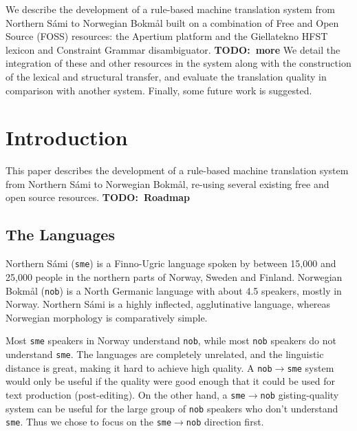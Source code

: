 \newcommand{\comment}[1]{\textbf{TODO:~#1}}


\newcommand{\href}[2]{{\tt #1}} %

\newcommand{\sme}{{\tt sme}}
\newcommand{\nob}{{\tt nob}}
\newcommand{\smenob}{\sme$\rightarrow{}$\nob}
\newcommand{\nobsme}{\nob$\rightarrow{}$\sme}



  
    We describe the development of a rule-based machine translation
    system from Northern Sámi to Norwegian Bokmål built on a
    combination of Free and Open Source (FOSS) resources: the Apertium
    platform and the Giellatekno HFST lexicon and Constraint Grammar
    disambiguator.
    \comment{more}
    We detail the integration of these and other resources in the
    system along with the construction of the lexical and structural
    transfer, and evaluate the translation quality in comparison with
    another system. Finally, some future work is suggested.




\section{Introduction}
This paper describes the development of a rule-based machine
translation system from Northern Sámi to Norwegian Bokmål, re-using
several existing free and open source resources. \comment{Roadmap}

\subsection{The Languages}
Northern Sámi (\sme{}) is a Finno-Ugric language spoken by between
15,000 and 25,000 people in the northern parts of Norway, Sweden and
Finland. Norwegian Bokmål (\nob{}) is a North Germanic language with
about 4.5 speakers, mostly in Norway. Northern Sámi is a highly
inflected, agglutinative language, whereas Norwegian morphology is
comparatively simple.

Most \sme{} speakers in Norway understand \nob{}, while most \nob{}
speakers do not understand \sme{}. The languages are completely
unrelated, and the linguistic distance is great, making it hard to
achieve high quality. A \nobsme{} system would only be useful if the
quality were good enough that it could be used for text production
(post-editing). On the other hand, a \smenob{} gisting-quality system
can be useful for the large group of \nob{} speakers who don't
understand \sme{}. Thus we chose to focus on the \smenob{} direction
first.

